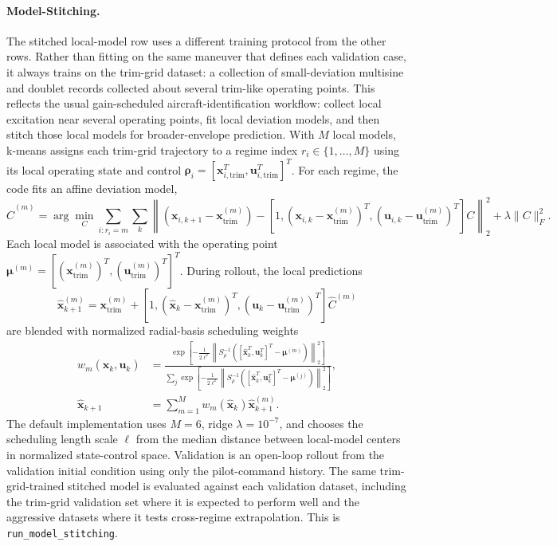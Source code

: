 \documentclass[11pt]{article}
\begin{document}
\paragraph{Model-Stitching.}
The stitched local-model row uses a different training protocol from the other
rows. Rather than fitting on the same maneuver that defines each validation
case, it always trains on the trim-grid dataset: a collection of small-deviation
multisine and doublet records collected about several trim-like operating
points. This reflects the usual gain-scheduled aircraft-identification workflow:
collect local excitation near several operating points, fit local deviation
models, and then stitch those local models for broader-envelope prediction.
With $M$ local models, k-means assigns each trim-grid trajectory to a regime
index $r_i\in\{1,\ldots,M\}$ using its local operating state and control
$\boldsymbol{\rho}_i=[\mathbf{x}_{i,\mathrm{trim}}^T,
\mathbf{u}_{i,\mathrm{trim}}^T]^T$. For each regime, the code fits an affine
deviation model,
\begin{equation}
    \widehat{C}^{(m)}
    =
    \arg\min_C
    \sum_{i:r_i=m}\sum_k
    \left\|
    (\mathbf{x}_{i,k+1}-\mathbf{x}^{(m)}_{\mathrm{trim}})
    -
    [1,(\mathbf{x}_{i,k}-\mathbf{x}^{(m)}_{\mathrm{trim}})^T,
       (\mathbf{u}_{i,k}-\mathbf{u}^{(m)}_{\mathrm{trim}})^T]C
    \right\|_2^2
    +\lambda\|C\|_F^2.
    \label{eq:code_model_stitching_local}
\end{equation}
Each local model is associated with the operating point
$\boldsymbol{\mu}^{(m)}=[(\mathbf{x}^{(m)}_{\mathrm{trim}})^T,
(\mathbf{u}^{(m)}_{\mathrm{trim}})^T]^T$. During rollout, the local
predictions
\[
    \hat{\mathbf{x}}_{k+1}^{(m)}
    =
    \mathbf{x}^{(m)}_{\mathrm{trim}}
    +
    [1,(\hat{\mathbf{x}}_k-\mathbf{x}^{(m)}_{\mathrm{trim}})^T,
       (\mathbf{u}_k-\mathbf{u}^{(m)}_{\mathrm{trim}})^T]\widehat{C}^{(m)}
\]
are blended with normalized radial-basis scheduling weights
\begin{align}
    w_m(\hat{\mathbf{x}}_k,\mathbf{u}_k)
    &=
    \frac{
    \exp\left[-\frac{1}{2\ell^2}
    \left\|S_\rho^{-1}([\hat{\mathbf{x}}_k^T,\mathbf{u}_k^T]^T-\boldsymbol{\mu}^{(m)})\right\|_2^2\right]
    }{
    \sum_j
    \exp\left[-\frac{1}{2\ell^2}
    \left\|S_\rho^{-1}([\hat{\mathbf{x}}_k^T,\mathbf{u}_k^T]^T-\boldsymbol{\mu}^{(j)})\right\|_2^2\right]
    },\\
    \hat{\mathbf{x}}_{k+1}
    &= \sum_{m=1}^{M} w_m(\hat{\mathbf{x}}_k)\hat{\mathbf{x}}_{k+1}^{(m)}.
    \label{eq:code_model_stitching}
\end{align}
The default implementation uses $M=6$, ridge $\lambda=10^{-7}$, and chooses
the scheduling length scale $\ell$ from the median distance between local-model
centers in normalized state-control space. Validation is an open-loop rollout
from the validation initial condition using only the pilot-command history. The
same trim-grid-trained stitched model is evaluated against each validation
dataset, including the trim-grid validation set where it is expected to perform
well and the aggressive datasets where it tests cross-regime extrapolation. This is
\texttt{run\_model\_stitching}.
\end{document}
